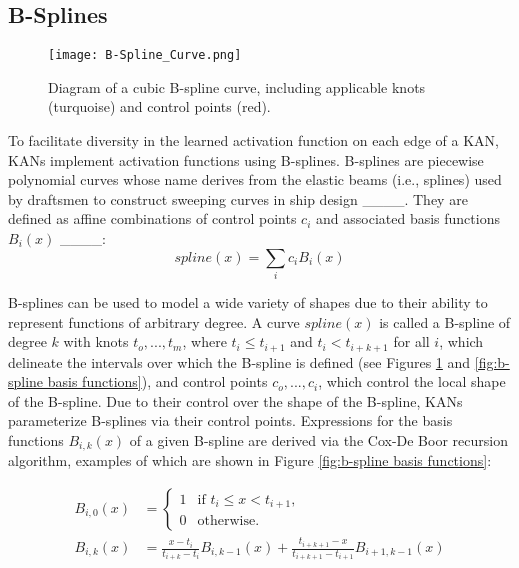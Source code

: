 \subsection{B-Splines}
\begin{figure} [ht]
\begin{center}
\centerline{\texttt{[image: B-Spline\_Curve.png]}}
\caption{Diagram of a cubic B-spline curve, including applicable knots (turquoise) and control points (red).}
\label{fig:b-spline curve}
\end{center}
\end{figure}
To facilitate diversity in the learned activation function on each edge of a KAN, KANs implement activation functions using B-splines.  B-splines are piecewise polynomial curves whose name derives from the elastic beams (i.e., splines) used by draftsmen to construct sweeping curves in ship design ____.  They are defined as affine combinations of control points \(c_i\) and associated basis functions \(B_i (x)\) ____:
\begin{equation} \label{eq:KANspline-1}
spline(x) = \sum_i c_i B_i(x)
\end{equation}

B-splines can be used to model a wide variety of shapes due to their ability to represent functions of arbitrary degree.  A curve \(spline(x)\) is called a B-spline of degree \(k\) with knots \(t_o, ..., t_m\), where \(t_i \leq t_{i+1}\) and \(t_i < t_{i+k+1}\) for all \(i\), which delineate the intervals over which the B-spline is defined (see Figures \ref{fig:b-spline curve} and \ref{fig:b-spline basis functions}), and control points \(c_o, ..., c_i\), which control the local shape of the B-spline. Due to their control over the shape of the B-spline, KANs parameterize B-splines via their control points. Expressions for the basis functions \(B_{i,k} (x)\) of a given B-spline are derived via the Cox-De Boor recursion algorithm, examples of which are shown in Figure \ref{fig:b-spline basis functions}:

\begin{small}
\begin{equation} \label{eq:Cox-De Boor}
\begin{split}
B_{i,0} (x) & =
\begin{cases}
1 & \text{if } t_i \leq x < t_{i+1},\\
0 & \text{otherwise.}
\end{cases} \\
B_{i,k} (x) & = \frac{x - t_i}{t_{i+k} - t_i} B_{i, k-1} (x) + \frac{t_{i+k+1} - x}{t_{i+k+1} - t_{i+1}} B_{i+1, k-1} (x)
\end{split}
\end{equation}
\end{small}

